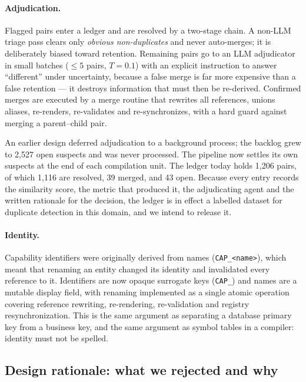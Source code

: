\documentclass[10pt,a4paper]{article}
\begin{document}
\paragraph{Adjudication.} Flagged pairs enter a ledger and are resolved by a
two-stage chain. A non-LLM triage pass clears only \emph{obvious non-duplicates}
and never auto-merges; it is deliberately biased toward retention. Remaining pairs
go to an LLM adjudicator in small batches ($\leq 5$ pairs, $T=0.1$) with an
explicit instruction to answer ``different'' under uncertainty, because a false
merge is far more expensive than a false retention --- it destroys information
that must then be re-derived. Confirmed merges are executed by a merge routine
that rewrites all references, unions aliases, re-renders, re-validates and
re-synchronizes, with a hard guard against merging a parent--child pair.

An earlier design deferred adjudication to a background process; the backlog grew
to 2{,}527 open suspects and was never processed. The pipeline now settles its own
suspects at the end of each compilation unit. The ledger today holds 1{,}206
pairs, of which 1{,}116 are resolved, 39 merged, and 43 open. Because every entry
records the similarity score, the metric that produced it, the adjudicating
agent and the written rationale for the decision, the ledger is in effect a
labelled dataset for duplicate detection in this domain, and we intend to release
it.

\paragraph{Identity.} Capability identifiers were originally derived from names
(\texttt{CAP\_<name>}), which meant that renaming an entity changed its identity
and invalidated every reference to it. Identifiers are now opaque surrogate keys
(\texttt{CAP\_<8--12 hex>}) and names are a mutable display field, with renaming
implemented as a single atomic operation covering reference rewriting,
re-rendering, re-validation and registry resynchronization. This is the same
argument as separating a database primary key from a business key, and the same
argument as symbol tables in a compiler: identity must not be spelled.


\subsection{Design rationale: what we rejected and why}
\label{sec:rationale}
\end{document}

